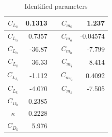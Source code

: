 \begin{table} [htbp]
  \begin{center}
    \caption{Identified parameters}
    \label{tb:si_result}
    \begin{tabular}{|c||r|cc||r|} \hline
      $C_{L_0}$ & 0.1313 & & $C_{m_0}$ & 1.237 \\ \hline
      $C_{L_\alpha}$ & 0.7357 & & $C_{m_\alpha}$ & -0.04574 \\ \hline
      $C_{L_{\dot{\alpha}}}$ & -36.87 & & $C_{m_{\dot{\alpha}}}$ & -7.799 \\ \hline
      $C_{L_q}$ & 36.33 & & $C_{m_q}$ & 8.414 \\ \hline
      $C_{L_{\delta_e}}$ & -1.112 & & $C_{m_{\delta_e}}$ & 0.4092 \\ \hline
      $C_{L_k}$ & -4.070 & & $C_{m_k}$ & -7.505 \\ \hline
      $C_{D_0}$ & 0.2385 &&&\\ \hline
      $\kappa$ & 0.2228 &&&\\ \hline
      $C_{D_k}$ & 5.976 &&&\\ \hline
    \end{tabular}
  \end{center}
\end{table}

